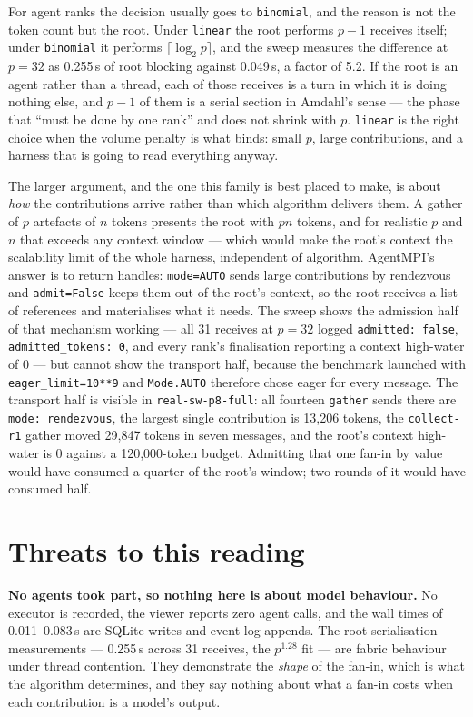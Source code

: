 \documentclass[11pt]{article}
\begin{document}
For agent ranks the decision usually goes to \texttt{binomial}, and the reason is not the token
count but the root. Under \texttt{linear} the root performs $p-1$ receives itself; under
\texttt{binomial} it performs $\lceil\log_2 p\rceil$, and the sweep measures the difference at
$p=32$ as 0.255\,s of root blocking against 0.049\,s, a factor of 5.2. If the root is an agent
rather than a thread, each of those receives is a turn in which it is doing nothing else, and
$p-1$ of them is a serial section in Amdahl's sense --- the phase that ``must be done by one
rank'' and does not shrink with $p$. \texttt{linear} is the right choice when the volume penalty
is what binds: small $p$, large contributions, and a harness that is going to read everything
anyway.

The larger argument, and the one this family is best placed to make, is about \emph{how} the
contributions arrive rather than which algorithm delivers them. A gather of $p$ artefacts of $n$
tokens presents the root with $pn$ tokens, and for realistic $p$ and $n$ that exceeds any context
window --- which would make the root's context the scalability limit of the whole harness,
independent of algorithm. AgentMPI's answer is to return handles: \texttt{mode=AUTO} sends large
contributions by rendezvous and \texttt{admit=False} keeps them out of the root's context, so the
root receives a list of references and materialises what it needs. The sweep shows the admission
half of that mechanism working --- all 31 receives at $p=32$ logged \texttt{admitted: false},
\texttt{admitted\_tokens: 0}, and every rank's finalisation reporting a context high-water of 0
--- but cannot show the transport half, because the benchmark launched with
\texttt{eager\_limit=10**9} and \texttt{Mode.AUTO} therefore chose eager for every message.
The transport half is visible in \texttt{real-sw-p8-full}: all fourteen \texttt{gather} sends
there are \texttt{mode: rendezvous}, the largest single contribution is 13,206 tokens, the
\texttt{collect-r1} gather moved 29,847 tokens in seven messages, and the root's context
high-water is 0 against a 120,000-token budget. Admitting that one fan-in by value would have
consumed a quarter of the root's window; two rounds of it would have consumed half.

\section{Threats to this reading}

\textbf{No agents took part, so nothing here is about model behaviour.} No executor is recorded,
the viewer reports zero agent calls, and the wall times of 0.011--0.083\,s are SQLite writes and
event-log appends. The root-serialisation measurements --- 0.255\,s across 31 receives, the
$p^{1.28}$ fit --- are fabric behaviour under thread contention. They demonstrate the
\emph{shape} of the fan-in, which is what the algorithm determines, and they say nothing about
what a fan-in costs when each contribution is a model's output.
\end{document}
